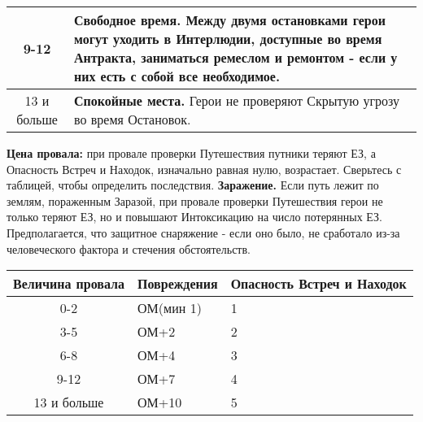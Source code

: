 \begin{enumerate}
\begin{center}
\begin{tabular}{|c|p{10cm}|}
      9-12 & \textbf{Свободное время.} Между двумя остановками герои могут уходить в Интерлюдии, доступные во время Антракта, заниматься ремеслом и ремонтом - если у них есть с собой все необходимое. \\ \hline
      13 и больше & \textbf{Спокойные места.} Герои не проверяют Скрытую угрозу во время Остановок. \\ \hline
    \end{tabular} \end{center}
    \textbf{Цена провала:} при провале проверки Путешествия путники теряют ЕЗ, а Опасность Встреч и Находок, изначально равная нулю, возрастает.  Сверьтесь с таблицей, чтобы определить последствия.
    \newline \textbf{Заражение.} Если путь лежит по землям, пораженным Заразой, при провале проверки Путешествия герои не только теряют ЕЗ, но и повышают Интоксикацию на число потерянных ЕЗ. Предполагается, что защитное снаряжение - если оно было, не сработало из-за человеческого фактора и стечения обстоятельств.

    \begin{center} \begin{tabular}{|c|p{5cm}|p{5cm}|} \hline
      \textbf{Величина провала} & \textbf{Повреждения} & \textbf{Опасность Встреч и Находок} \\ \hline
      0-2 & ОМ(мин 1) & 1 \\ \hline
      3-5 & ОМ+2 & 2 \\ \hline
      6-8 & ОМ+4 & 3 \\ \hline
      9-12 & ОМ+7 & 4 \\ \hline
      13 и больше & ОМ+10 & 5 \\ \hline
    \end{tabular} \end{center}


\end{enumerate}
